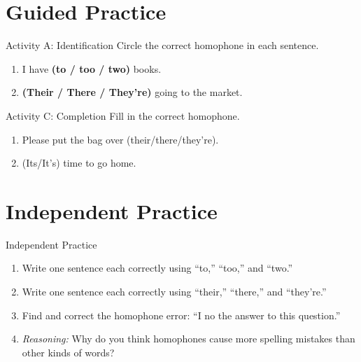 \section{Guided Practice}
\begin{activitybox}{Activity A: Identification}
Circle the correct homophone in each sentence.
\begin{enumerate}
    \item I have \textbf{(to / too / two)} books.
    \item \textbf{(Their / There / They're)} going to the market.
\end{enumerate}
\end{activitybox}

\begin{activitybox}{Activity C: Completion}
Fill in the correct homophone.
\begin{enumerate}
    \item Please put the bag over \underline{\hspace{1.5cm}} (their/there/they're).
    \item \underline{\hspace{1.5cm}} (Its/It's) time to go home.
\end{enumerate}
\end{activitybox}

\section{Independent Practice}
\begin{activitybox}{Independent Practice}
\begin{enumerate}
    \item Write one sentence each correctly using ``to,'' ``too,'' and ``two.''
    \item Write one sentence each correctly using ``their,'' ``there,'' and ``they're.''
    \item Find and correct the homophone error: ``I no the answer to this question.''
    \item \textit{Reasoning:} Why do you think homophones cause more spelling mistakes than other kinds of words?
\end{enumerate}
\end{activitybox}

